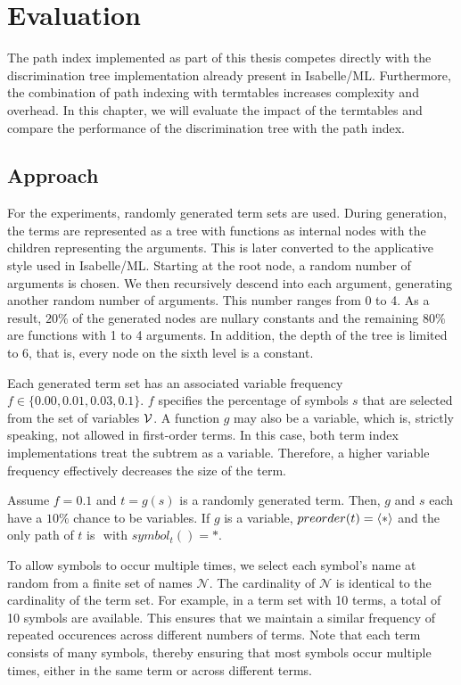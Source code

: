 \chapter{Evaluation} \label{evaluation}
The path index implemented as part of this thesis competes directly with the discrimination tree implementation already present in Isabelle/ML. Furthermore, the combination of path indexing with termtables increases complexity and overhead. In this chapter, we will evaluate the impact of the termtables and compare the performance of the discrimination tree with the path index.

\section{Approach} \label{approach}
For the experiments, randomly generated term sets are used. During generation, the terms are represented as a tree with functions as internal nodes with the children representing the arguments. This is later converted to the applicative style used in Isabelle/ML.
Starting at the root node, a random number of arguments is chosen. We then recursively descend into each argument, generating another random number of arguments. This number ranges from 0 to 4. As a result, $20\%$ of the generated nodes are nullary constants and the remaining $80\%$ are functions with 1 to 4 arguments. In addition, the depth of the tree is limited to 6, that is, every node on the sixth level is a constant.

Each generated term set has an associated variable frequency $f \in \{0.00, 0.01, 0.03, 0.1\}$. $f$ specifies the percentage of symbols $s$ that are selected from the set of variables $\mathcal{V}$. A function $g$ may also be a variable, which is, strictly speaking, not allowed in first-order terms. In this case, both term index implementations treat the subtrem as a variable. Therefore, a higher variable frequency effectively decreases the size of the term.

\begin{exmpl}
  Assume $f = 0.1$ and $t = g(s)$ is a randomly generated term. Then, $g$ and $s$ each have a $10\%$ chance to be variables. If $g$ is a variable, $preorder(t) = \langle * \rangle$ and the only path of $t$ is $\ang{}$ with $symbol_{t}(\ang{}) = *$.
\end{exmpl}

To allow symbols to occur multiple times, we select each symbol's name at random from a finite set of names $\mathcal{N}$.
The cardinality of $\mathcal{N}$ is identical to the cardinality of the term set. For example, in a term set with 10 terms, a total of 10 symbols are available.
This ensures that we maintain a similar frequency of repeated occurences across different numbers of terms.
Note that each term consists of many symbols, thereby ensuring that most symbols occur multiple times, either in the same term or across different terms.

